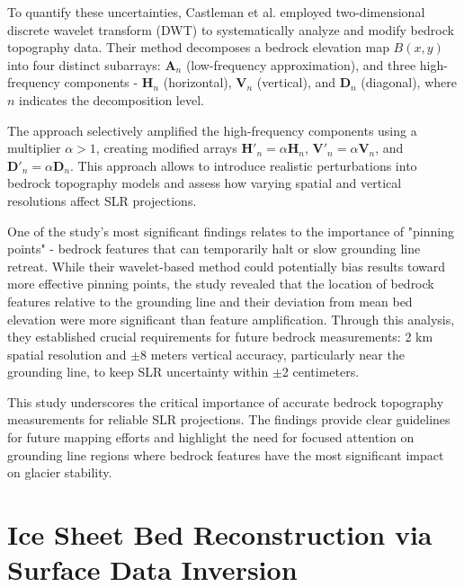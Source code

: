 To quantify these uncertainties, Castleman et al.\cite{Castleman_2022} employed two-dimensional discrete wavelet transform (DWT) to systematically analyze and modify bedrock topography data. Their method decomposes a bedrock elevation map $B(x,y)$ into four distinct subarrays: $\mathbf{A}_n$ (low-frequency approximation), and three high-frequency components - $\mathbf{H}_n$ (horizontal), $\mathbf{V}_n$ (vertical), and $\mathbf{D}_n$ (diagonal), where $n$ indicates the decomposition level. 

The approach selectively amplified the high-frequency components using a multiplier $\alpha > 1$, creating modified arrays $\mathbf{H}'_n = \alpha\mathbf{H}_n$, $\mathbf{V}'_n = \alpha\mathbf{V}_n$, and $\mathbf{D}'_n = \alpha\mathbf{D}_n$. This approach allows to introduce realistic perturbations into bedrock topography models and assess how varying spatial and vertical resolutions affect SLR projections.

One of the study's most significant findings relates to the importance of "pinning points" - bedrock features that can temporarily halt or slow grounding line retreat. While their wavelet-based method could potentially bias results toward more effective pinning points, the study revealed that the location of bedrock features relative to the grounding line and their deviation from mean bed elevation were more significant than feature amplification\cite{Castleman_2022}. Through this analysis, they established crucial requirements for future bedrock measurements: 2 km spatial resolution and $\pm$8 meters vertical accuracy, particularly near the grounding line, to keep SLR uncertainty within $\pm$2 centimeters.

This study underscores the critical importance of accurate bedrock topography measurements for reliable SLR projections. The findings provide clear guidelines for future mapping efforts and highlight the need for focused attention on grounding line regions where bedrock features have the most significant impact on glacier stability.

\section{Ice Sheet Bed Reconstruction via Surface Data Inversion}\label{Ockenden_2022}

